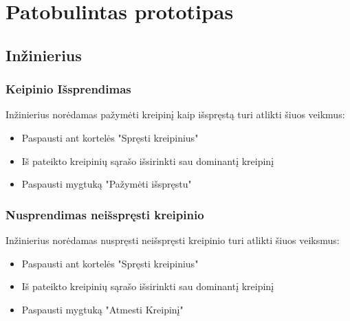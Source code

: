 
\section{Patobulintas prototipas}

\subsection{Inžinierius}
	
	
	

	\subsubsection{Keipinio Išsprendimas}
	
	Inžinierius norėdamas pažymėti kreipinį kaip išspręstą turi atlikti šiuos veikmus:
	\begin{itemize}
		\item Paspausti ant kortelės "Spręsti kreipinius" 
		\item Iš pateikto kreipinių sąrašo išsirinkti sau dominantį kreipinį 
		\item Paspausti mygtuką "Pažymėti išspręstu" 
	\end{itemize}
	
	\subsubsection{Nusprendimas neišspręsti kreipinio}
	
	Inžinierius norėdamas nuspręsti neišspręsti kreipinio turi atlikti šiuos veiksmus:
	
	\begin{itemize}
		\item Paspausti ant kortelės "Spręsti kreipinius" 
		\item Iš pateikto kreipinių sąrašo išsirinkti sau dominantį kreipinį 
		\item Paspausti mygtuką "Atmesti Kreipinį" 
	\end{itemize}
	
